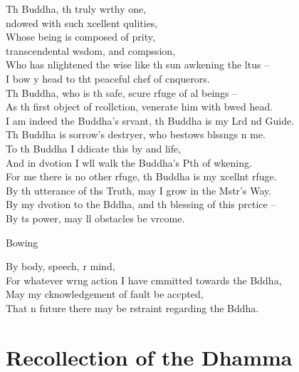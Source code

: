 Th Buddha, th truly wrthy one,\\
\vin {}ndowed with such xcellent qulities,\\
Whose being is composed of prity,\\
\vin transcendental wsdom, and compssion,\\
Who has nlightened the wise like th sun awkening the ltus --\\
I bow y head to tht peaceful chef of cnquerors.\\
Th Buddha, who is th safe, scure rfuge of al beings --\\
As th first object of rcollction,  venerate him with bwed head.\\
I am indeed the Buddha's srvant, th Buddha is my Lrd nd Guide.\\
Th Buddha is sorrow's destryer, who bestows blssngs n me.\\
To th Buddha I ddicate this by and life,\\
And in dvotion I wll walk the Buddha's Pth of wkening.\\
For me there is no other rfuge, th Buddha is my xcellnt rfuge.\\
By th utterance of ths Truth, may I grow in the Mstr's Way.\\
By my dvotion to the Bddha, and th blessing of this prctice --\\
By ts power, may ll obstacles be vrcome.

\begin{instruction}
  Bowing
\end{instruction}

By body, speech, r mind,\\
For whatever wrng action I have cmmitted towards the Bddha,\\
May my cknowledgement of fault be accpted,\\
That n future there may be rstraint regarding the Bddha.

\clearpage

\chapter{Recollection of the Dhamma}%

